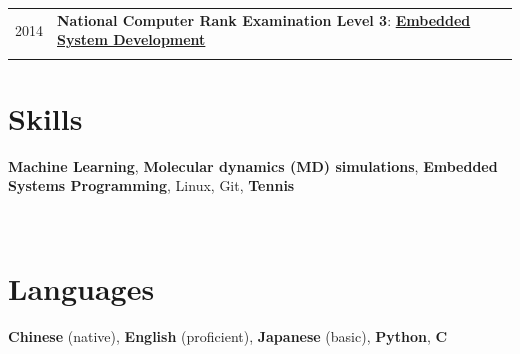 \documentclass[a4paper,10pt]{article} %
\begin{document}
\begin{tabular}{r|l}
2014					& \textbf{National Computer Rank Examination Level 3}: \href{https://way2ml.github.io/_static/cv/2021_11_26_11_6.png}{\textbf{Embedded System Development}}\\
\multicolumn{2}{c}{} \\	%

\end{tabular}

\section{Skills}
\begin{small}
\textbf{Machine Learning},  \textbf{Molecular dynamics (MD) simulations}, \textbf{Embedded Systems Programming},  Linux, Git, \textbf{Tennis}
\end{small}
\\

\section{Languages}
\textbf{Chinese} (native),  \textbf{English} (proficient),  \textbf{Japanese} (basic), \textbf{Python}, \textbf{C}
\\
\end{document}
